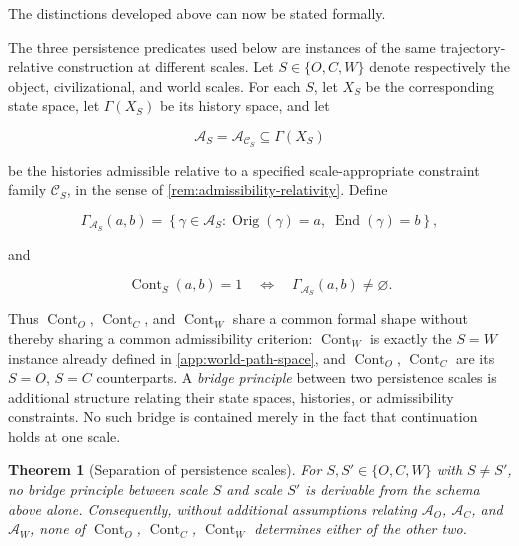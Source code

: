 \documentclass[
  11pt,
  a4paper,
  DIV=12,
  BCOR=0mm,
  parskip=half-
]{scrartcl}
\newcommand{\End}{\operatorname{End}}
\newcommand{\Orig}{\operatorname{Orig}}
\newcommand{\Cont}{\operatorname{Cont}}
\theoremstyle{definition}
\theoremstyle{plain}
\newtheorem{theorem}[definition]{Theorem}
\theoremstyle{remark}
\begin{document}
The distinctions developed above can now be stated formally.

The three persistence predicates used below are instances of the same
trajectory-relative construction at different scales. Let \(S\in\{O,C,W\}\)
denote respectively the object, civilizational, and world scales. For each
\(S\), let \(X_S\) be the corresponding state space, let \(\Gamma(X_S)\) be
its history space, and let

\[
  \mathcal A_S=\mathcal A_{\mathcal C_S}\subseteq\Gamma(X_S)
\]

be the histories admissible relative to a specified scale-appropriate
constraint family \(\mathcal C_S\), in the sense of
\cref{rem:admissibility-relativity}. Define

\[
  \Gamma_{\mathcal A_S}(a,b)
  =
  \left\{
    \gamma\in\mathcal A_S:
    \Orig(\gamma)=a,\;
    \End(\gamma)=b
  \right\},
\]

and

\[
  \Cont_S(a,b)=1
  \quad\Longleftrightarrow\quad
  \Gamma_{\mathcal A_S}(a,b)\neq\varnothing.
\]

Thus \(\Cont_O\), \(\Cont_C\), and \(\Cont_W\) share a common formal shape
without thereby sharing a common admissibility criterion: \(\Cont_W\) is
exactly the \(S=W\) instance already defined in
\cref{app:world-path-space}, and \(\Cont_O\), \(\Cont_C\) are its \(S=O\),
\(S=C\) counterparts. A \emph{bridge principle} between two persistence
scales is additional structure relating their state spaces, histories, or
admissibility constraints. No such bridge is contained merely in the fact
that continuation holds at one scale.

\begin{theorem}[Separation of persistence scales]
\label{thm:persistence-separation}
For \(S,S'\in\{O,C,W\}\) with \(S\neq S'\), no bridge principle between
scale \(S\) and scale \(S'\) is derivable from the schema above alone.
Consequently, without additional assumptions relating \(\mathcal A_O\),
\(\mathcal A_C\), and \(\mathcal A_W\), none of \(\Cont_O\), \(\Cont_C\),
\(\Cont_W\) determines either of the other two.
\end{theorem}
\end{document}
